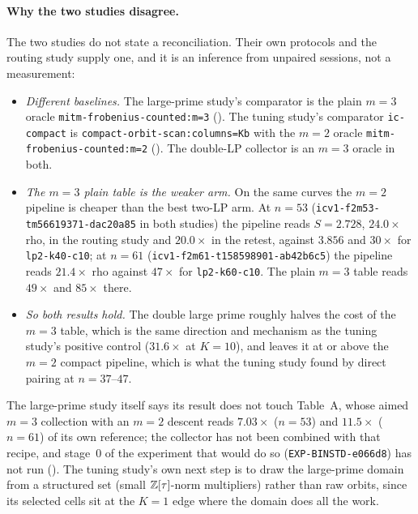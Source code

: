 \paragraph{Why the two studies disagree.} The two studies do not state a
reconciliation. Their own protocols and the routing study supply one, and
it is an inference from unpaired sessions, not a measurement:
\begin{itemize}
\item \emph{Different baselines.} The large-prime study's comparator is the
  plain $m=3$ oracle \texttt{mitm-frobenius-counted:m=3}
  (). The tuning
  study's comparator \texttt{ic-compact} is
  \texttt{compact-orbit-scan:columns=Kb} with the $m=2$ oracle
  \texttt{mitm-frobenius-counted:m=2}
  (). The
  double-LP collector is an $m=3$ oracle in both.
\item \emph{The $m=3$ plain table is the weaker arm.} On the same curves the
  $m=2$ pipeline is cheaper than the best two-LP arm. At $n=53$
  (\texttt{icv1-f2m53-tm56619371-dac20a85} in both studies) the pipeline
  reads $S=2.728$, $24.0\times$ rho, in the routing study and $20.0\times$
  in the retest, against $3.856$ and $30\times$ for \texttt{lp2-k40-c10};
  at $n=61$ (\texttt{icv1-f2m61-t158598901-ab42b6c5}) the pipeline reads
  $21.4\times$ rho against $47\times$ for \texttt{lp2-k60-c10}. The plain
  $m=3$ table reads $49\times$ and $85\times$ there.
\item \emph{So both results hold.} The double large prime roughly halves
  the cost of the $m=3$ table, which is the same direction and mechanism as
  the tuning study's positive control ($31.6\times$ at $K=10$), and leaves
  it at or above the $m=2$ compact pipeline, which is what the tuning study
  found by direct pairing at $n=37$--$47$.
\end{itemize}
The large-prime study itself says its result does not touch Table~A, whose
aimed $m=3$ collection with an $m=2$ descent reads $7.03\times$ ($n=53$)
and $11.5\times$ ($n=61$) of its own reference; the collector has not been
combined with that recipe, and stage~0 of the experiment that would do so
(\texttt{EXP-BINSTD-e066d8}) has not run
().
The tuning study's own next step is to draw the large-prime domain from a
structured set (small $\mathbb{Z}[\tau]$-norm multipliers) rather than raw orbits,
since its selected cells sit at the $K=1$ edge where the domain does all the
work.

